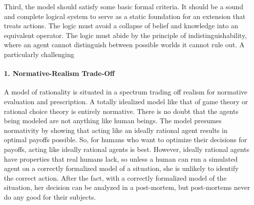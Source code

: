 Third, the model should satisfy some basic formal criteria. It should be a sound and complete logical system to serve as a static foundation for an extension that treats actions. The logic must avoid a collapse of belief and knowledge into an equivalent operator. The logic must abide by the principle of indistinguishability, where an agent cannot distinguish between possible worlds it cannot rule out. A particularly challenging 

\paragraph{1. Normative-Realism Trade-Off} 
A model of rationality is situated in a spectrum trading off realism for normative evaluation and prescription. A totally idealized model like that of game theory or rational choice theory is entirely normative. There is no doubt that the agents being modeled are not anything like human beings. The model presumes normativity by showing that acting like an ideally rational agent results in optimal payoffs possible. So, for humans who want to optimize their decisions for payoffs, acting like ideally rational agents is best. However, ideally rational agents have properties that real humans lack, so unless a human can run a simulated agent on a correctly formalized model of a situation, she is unlikely to identify the correct action. After the fact, with a correctly formalized model of the situation, her decision can be analyzed in a post-mortem, but post-mortems never do any good for their subjects.


